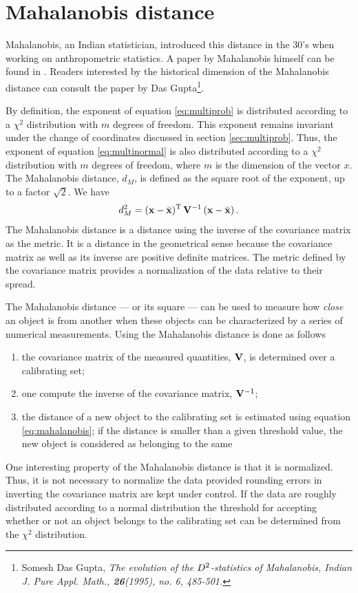 \documentclass[twoside]{book}
\begin{document}
\section{Mahalanobis distance}
\label{sec:mahalanobis} Mahalanobis, an Indian statistician,
introduced this distance in the 30's when working on
anthropometric statistics. A paper by Mahalanobis himself can be
found in \cite{AtchBry}. Readers interested by the historical
dimension of the Mahalanobis distance can consult the paper by Das
Gupta\footnote{Somesh Das Gupta, \em{The evolution of the $D\sp
2$-statistics of Mahalanobis}, Indian J. Pure Appl. Math., {\bf
26}(1995), no. 6, 485-501.}.

By definition, the exponent of equation \ref{eq:multiprob} is
distributed according to a $\chi^2$ distribution with $m$ degrees
of freedom. This exponent remains invariant under the change of
coordinates discussed in section \ref{sec:multiprob}. Thus, the
exponent of equation \ref{eq:multinormal} is also distributed
according to a $\chi^2$ distribution with $m$ degrees of freedom,
where $m$ is the dimension of the vector $x$. The Mahalanobis
distance, $d_M$, is defined as the square root of the exponent, up
to a factor $\sqrt{2}$. We have
\begin{equation}
\label{eq:mahalanobis} d^2_M = \left({\bf x}-\bar{{\bf
x}}\right)^{\mathop{\rm T}} {\bf V}^{-1}\left({\bf x}-\bar{{\bf
x}}\right).
\end{equation}
The Mahalanobis distance is a distance using the inverse of the
covariance matrix as the metric. It is a distance in the
geometrical sense because the covariance matrix as well as its
inverse are positive definite matrices. The metric defined by the
covariance matrix provides a normalization of the data relative to
their spread.

The Mahalanobis distance --- or its square --- can be used to
measure how {\sl close} an object is from another when these
objects can be characterized by a series of numerical
measurements. Using the Mahalanobis distance is done as follows
\begin{enumerate}
  \item the covariance matrix of the measured quantities, ${\bf V}$, is
determined over a calibrating set;
  \item one compute the inverse of the covariance matrix,
  ${\bf V}^{-1}$;
  \item the distance of a new object to the calibrating set is
  estimated using equation \ref{eq:mahalanobis}; if the distance
  is smaller than a given threshold value, the new object is
  considered as belonging to the same
\end{enumerate}
One interesting property of the Mahalanobis distance is that it is
normalized. Thus, it is not necessary to normalize the data
provided rounding errors in inverting the covariance matrix are
kept under control. If the data are roughly distributed according
to a normal distribution the threshold for accepting whether or
not an object belongs to the calibrating set can be determined
from the $\chi^2$ distribution.
\end{document}

